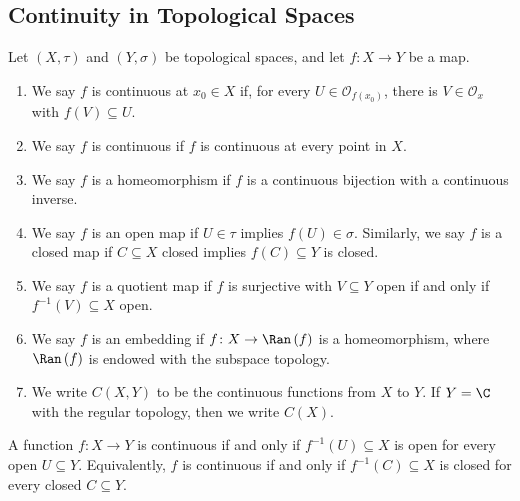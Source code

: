 \subsection{Continuity in Topological Spaces}%
\begin{definition}
  Let $\left(X,\tau\right)$ and $\left(Y,\sigma\right)$ be topological spaces, and let $f\colon X\rightarrow Y$ be a map.
  \begin{enumerate}[(1)]
    \item We say $f$ is continuous at $x_0\in X$ if, for every $U\in \mathcal{O}_{f\left(x_0\right)}$, there is $V\in \mathcal{O}_{x}$ with $f\left(V\right)\subseteq U$.
    \item We say $f$ is continuous if $f$ is continuous at every point in $X$.
    \item We say $f$ is a homeomorphism if $f$ is a continuous bijection with a continuous inverse.
    \item We say $f$ is an open map if $U\in \tau$ implies $f\left(U\right)\in \sigma$. Similarly, we say $f$ is a closed map if $C\subseteq X$ closed implies $f\left(C\right)\subseteq Y$ is closed.
    \item We say $f$ is a quotient map if $f$ is surjective with $V\subseteq Y$ open if and only if $f^{-1}\left(V\right)\subseteq X$ open.
    \item We say $f$ is an embedding if $f\colon X\rightarrow \Ran\left(f\right)$ is a homeomorphism, where $\Ran\left(f\right)$ is endowed with the subspace topology.
    \item We write $C\left(X,Y\right)$ to be the continuous functions from $X$ to $Y$. If $Y = \C$ with the regular topology, then we write $C\left(X\right)$.
  \end{enumerate}
\end{definition}
\begin{fact}
  A function $f\colon X\rightarrow Y$ is continuous if and only if $f^{-1}\left(U\right)\subseteq X$ is open for every open $U\subseteq Y$. Equivalently, $f$ is continuous if and only if $f^{-1}\left(C\right)\subseteq X$ is closed for every closed $C\subseteq Y$.
\end{fact}

